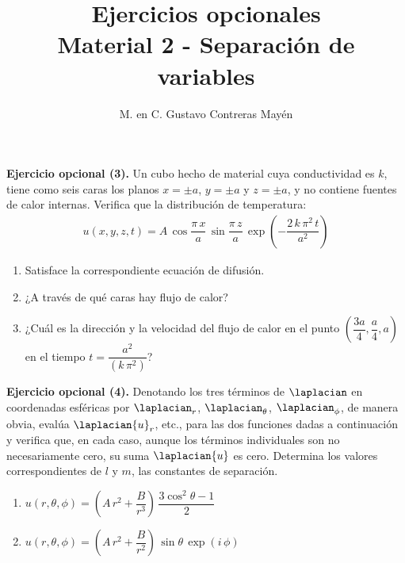
\title{Ejercicios opcionales \\[0.3em]  \large{Material 2 - Separación de variables} \vspace{-3ex}}
\author{M. en C. Gustavo Contreras Mayén}
\date{ }


\vspace{-4cm}
\maketitle
\fontsize{14}{14}\selectfont


\textbf{Ejercicio opcional (3).} Un cubo hecho de material cuya conductividad es $k$, tiene como seis caras los planos $x = \pm a$, $y = \pm a$ y $z = \pm a$, y no contiene fuentes de calor internas. Verifica que la distribución de temperatura:
\begin{align*}
u (x, y, z, t) = A \, \cos \dfrac{\pi \, x}{a} \, \sin \dfrac{\pi \, z}{a} \, \exp \left( - \dfrac{2 \, k \, \pi^{2} \, t}{a^{2}} \right)
\end{align*}
\begin{enumerate}[label=\alph*)]
\item Satisface la correspondiente ecuación de difusión.
\item ¿A través de qué caras hay flujo de calor?
\item ¿Cuál es la dirección y la velocidad del flujo de calor en el punto \hfill \break $\left(\dfrac{3 a}{4}, \dfrac{a}{4}, a \right)$ en el tiempo $t = \dfrac{a^{2}}{(k \, \pi^{2})}$?
\end{enumerate}
\textbf{Ejercicio opcional (4).} Denotando los tres términos de $\laplacian$ en coordenadas esféricas por $\laplacian_{r}$, $\laplacian_{\theta}$, $\laplacian_{\phi}$, de manera obvia, evalúa $\laplacian{u}_{r}$, etc., para las dos funciones dadas a continuación y verifica que, en cada caso, aunque los términos individuales son no necesariamente cero, su suma $\laplacian{u}$ es cero. Determina los valores correspondientes de $l$ y $m$, las constantes de separación.
\begin{enumerate}[label=\alph*)]
\item $u(r, \theta, \phi) = \left( A \, r^{2} + \dfrac{B}{r^{3}} \right) \, \dfrac{3 \cos^{2} \theta - 1}{2}$
\item $u(r, \theta, \phi) = \left( A \, r^{2} + \dfrac{B}{r^{2}} \right) \, \sin \theta \, \exp(i \, \phi)$
\end{enumerate}
